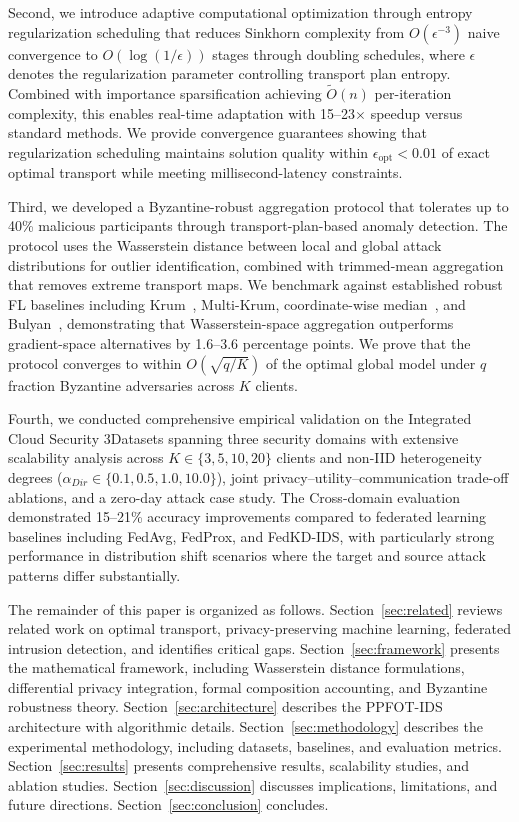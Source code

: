 \documentclass{ieeeaccess}
\theoremstyle{plain}
\theoremstyle{definition}
\theoremstyle{remark}
\begin{document}
Second, we introduce adaptive computational optimization through entropy regularization scheduling that reduces Sinkhorn complexity from $O(\epsilon^{-3})$ naive convergence to $O(\log(1/\epsilon))$ stages through doubling schedules, where $\epsilon$ denotes the regularization parameter controlling transport plan entropy. Combined with importance sparsification achieving $\tilde{O}(n)$ per-iteration complexity, this enables real-time adaptation with 15--23$\times$ speedup versus standard methods. We provide convergence guarantees showing that regularization scheduling maintains solution quality within $\epsilon_{\text{opt}} < 0.01$ of exact optimal transport while meeting millisecond-latency constraints.

Third, we developed a Byzantine-robust aggregation protocol that tolerates up to 40\% malicious participants through transport-plan-based anomaly detection. The protocol uses the Wasserstein distance between local and global attack distributions for outlier identification, combined with trimmed-mean aggregation that removes extreme transport maps. We benchmark against established robust FL baselines including Krum~\cite{blanchard2017}, Multi-Krum, coordinate-wise median~\cite{yin2018}, and Bulyan~\cite{guerraoui2018}, demonstrating that Wasserstein-space aggregation outperforms gradient-space alternatives by 1.6--3.6 percentage points. We prove that the protocol converges to within $O(\sqrt{q/K})$ of the optimal global model under $q$ fraction Byzantine adversaries across $K$ clients.

Fourth, we conducted comprehensive empirical validation on the Integrated Cloud Security 3Datasets spanning three security domains with extensive scalability analysis across $K \in \{3, 5, 10, 20\}$ clients and non-IID heterogeneity degrees ($\alpha_{Dir} \in \{0.1, 0.5, 1.0, 10.0\}$), joint privacy--utility--communication trade-off ablations, and a zero-day attack case study. The Cross-domain evaluation demonstrated 15--21\% accuracy improvements compared to federated learning baselines including FedAvg, FedProx, and FedKD-IDS, with particularly strong performance in distribution shift scenarios where the target and source attack patterns differ substantially.

The remainder of this paper is organized as follows. Section~\ref{sec:related} reviews related work on optimal transport, privacy-preserving machine learning, federated intrusion detection, and identifies critical gaps. Section~\ref{sec:framework} presents the mathematical framework, including Wasserstein distance formulations, differential privacy integration, formal composition accounting, and Byzantine robustness theory. Section~\ref{sec:architecture} describes the PPFOT-IDS architecture with algorithmic details. Section~\ref{sec:methodology} describes the experimental methodology, including datasets, baselines, and evaluation metrics. Section~\ref{sec:results} presents comprehensive results, scalability studies, and ablation studies. Section~\ref{sec:discussion} discusses implications, limitations, and future directions. Section~\ref{sec:conclusion} concludes.
\end{document}
